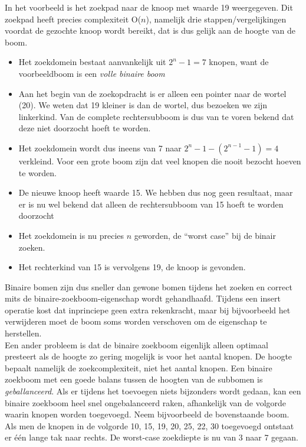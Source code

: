 \documentclass[a4paper,10pt]{article}
\begin{document}
In het voorbeeld is het zoekpad naar de knoop met waarde 19 weergegeven. Dit zoekpad heeft precies complexiteit O($n$), namelijk drie stappen/vergelijkingen voordat de gezochte knoop wordt bereikt, dat is dus gelijk aan de hoogte van de boom. 
\begin{itemize}
\item Het zoekdomein bestaat aanvankelijk uit $2^n-1 = 7$ knopen, want de voorbeeldboom is een \emph{volle binaire boom}
\item Aan het begin van de zoekopdracht is er alleen een pointer naar de wortel (20). We weten dat 19 kleiner is dan de wortel, dus bezoeken we zijn linkerkind. Van de complete rechtersubboom is dus van te voren bekend dat deze niet doorzocht hoeft te worden.
\item Het zoekdomein wordt dus ineens van 7 naar $2^n-1-(2^{n-1}-1)=4$ verkleind. Voor een grote boom zijn dat veel knopen die nooit bezocht hoeven te worden.
\item De nieuwe knoop heeft waarde 15. We hebben dus nog geen resultaat, maar er is nu wel bekend dat alleen de rechtersubboom van 15 hoeft te worden doorzocht
\item Het zoekdomein is nu precies $n$ geworden, de ``worst case'' bij de binair zoeken.
\item Het rechterkind van 15 is vervolgens 19, de knoop is gevonden.
\end{itemize}
Binaire bomen zijn dus sneller dan gewone bomen tijdens het zoeken en correct mits de binaire-zoekboom-eigenschap wordt gehandhaafd. Tijdens een insert operatie kost dat inprinciepe geen extra rekenkracht, maar bij bijvoorbeeld het verwijderen moet de boom soms worden verschoven om de eigenschap te herstellen. \\
Een ander probleem is dat de binaire zoekboom eigenlijk alleen optimaal presteert als de hoogte zo gering mogelijk is voor het aantal knopen. De hoogte bepaalt namelijk de zoekcomplexiteit, niet het aantal knopen. Een binaire zoekboom met een goede balans tussen de hoogten van de subbomen is \emph{geballanceerd}. Als er tijdens het toevoegen niets bijzonders wordt gedaan, kan een binaire zoekboom heel snel ongebalanceerd raken, afhankelijk van de volgorde waarin knopen worden toegevoegd. Neem bijvoorbeeld de bovenstaande boom. Als men de knopen in de volgorde 10, 15, 19, 20, 25, 22, 30 toegevoegd ontstaat er \'e\'en lange tak naar rechts. De worst-case zoekdiepte is nu van 3 naar 7 gegaan.
\end{document}
